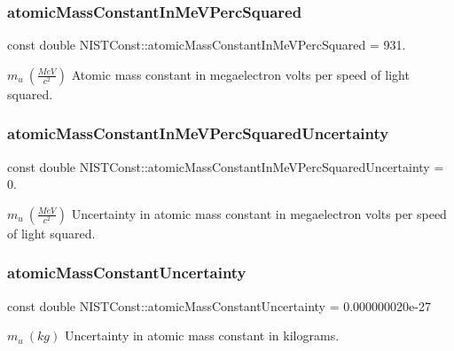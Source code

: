 \subsubsection{\texorpdfstring{atomic\+Mass\+Constant\+In\+Me\+V\+Perc\+Squared}{atomicMassConstantInMeVPercSquared}}
{\footnotesize\ttfamily const double N\+I\+S\+T\+Const\+::atomic\+Mass\+Constant\+In\+Me\+V\+Perc\+Squared = 931.}

$m_u \ (\frac{MeV}{c^2})$ Atomic mass constant in megaelectron volts per speed of light squared. \mbox{\label{group___atomic_mass_constant_ga797d82fd682854b4c1b88754bed2e70a}} 
\subsubsection{\texorpdfstring{atomic\+Mass\+Constant\+In\+Me\+V\+Perc\+Squared\+Uncertainty}{atomicMassConstantInMeVPercSquaredUncertainty}}
{\footnotesize\ttfamily const double N\+I\+S\+T\+Const\+::atomic\+Mass\+Constant\+In\+Me\+V\+Perc\+Squared\+Uncertainty = 0.}

$m_u \ (\frac{MeV}{c^2})$ Uncertainty in atomic mass constant in megaelectron volts per speed of light squared. \mbox{\label{group___atomic_mass_constant_gae44d47135c3f8d9e2b9c981649443efc}} 
\subsubsection{\texorpdfstring{atomic\+Mass\+Constant\+Uncertainty}{atomicMassConstantUncertainty}}
{\footnotesize\ttfamily const double N\+I\+S\+T\+Const\+::atomic\+Mass\+Constant\+Uncertainty = 0.\+000000020e-\/27}

$m_u \ (kg)$ Uncertainty in atomic mass constant in kilograms. 